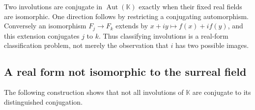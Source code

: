 \documentclass[11pt]{article}
\theoremstyle{definition}
\theoremstyle{remark}
\newcommand{\K}{\mathbb K}
\newcommand{\Aut}{\operatorname{Aut}}
\numberwithin{equation}{section}
\begin{document}
Two involutions are conjugate in $\Aut(\K)$ exactly when their fixed real
fields are isomorphic. One direction follows by restricting a conjugating
automorphism. Conversely an isomorphism $F_j\to F_k$ extends by
$x+iy\mapsto f(x)+if(y)$, and this extension conjugates $j$ to $k$.
Thus classifying involutions is a real-form classification problem, not
merely the observation that $i$ has two possible images.

\subsection{A real form not isomorphic to the surreal field}

The following construction shows that not all involutions of $\K$ are
conjugate to its distinguished conjugation.
\end{document}
